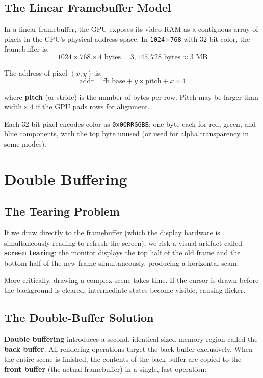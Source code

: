 \documentclass[12pt,a4paper]{report}
\begin{document}
\subsection{The Linear Framebuffer Model}

In a linear framebuffer, the GPU exposes its video RAM as a contiguous array of
pixels in the CPU's physical address space. In \texttt{1024$\times$768} with 32-bit
color, the framebuffer is:
\[
1024 \times 768 \times 4 \text{ bytes} = 3{,}145{,}728 \text{ bytes} \approx 3 \text{ MB}
\]

The address of pixel $(x, y)$ is:
\[
\text{addr} = \text{fb\_base} + y \times \text{pitch} + x \times 4
\]

where \textbf{pitch} (or stride) is the number of bytes per row. Pitch may be larger
than $\text{width} \times 4$ if the GPU pads rows for alignment.

Each 32-bit pixel encodes color as \texttt{0x00RRGGBB}: one byte each for red, green,
and blue components, with the top byte unused (or used for alpha transparency in some
modes).

\section{Double Buffering}

\subsection{The Tearing Problem}

If we draw directly to the framebuffer (which the display hardware is simultaneously
reading to refresh the screen), we risk a visual artifact called \textbf{screen tearing}:
the monitor displays the top half of the old frame and the bottom half of the new frame
simultaneously, producing a horizontal seam.

More critically, drawing a complex scene takes time. If the cursor is drawn before the
background is cleared, intermediate states become visible, causing flicker.

\subsection{The Double-Buffer Solution}

\textbf{Double buffering} introduces a second, identical-sized memory region called the
\textbf{back buffer}. All rendering operations target the back buffer exclusively. When
the entire scene is finished, the contents of the back buffer are copied to the
\textbf{front buffer} (the actual framebuffer) in a single, fast operation:
\end{document}
